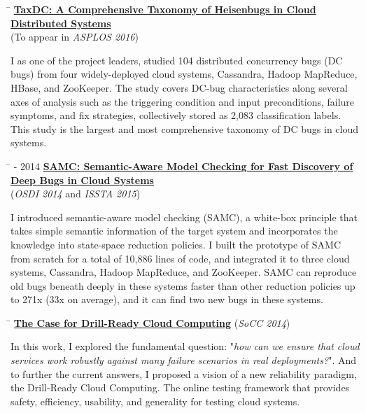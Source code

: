 \documentclass[10pt]{article} %
\begin{document}
\begin{tabbing}
\hspace{2.5cm} \=  \> \href{http://ucare.cs.uchicago.edu/pdf/asplos16-TaxDC.pdf}{\textbf{TaxDC: A Comprehensive Taxonomy of Heisenbugs in Cloud Distributed Systems}} \\
\>\+ (To appear in \textit{ASPLOS 2016}) \\
\begin{minipage}{\smallertextwidth}
I as one of the project leaders, studied 104 distributed concurrency bugs (DC
bugs) from four widely-deployed cloud systems, Cassandra, Hadoop MapReduce,
HBase, and ZooKeeper. The study covers DC-bug characteristics along several axes
of analysis such as the triggering condition and input preconditions, failure
symptoms, and fix strategies, collectively stored as 2,083 classification labels.
This study is the largest and most comprehensive taxonomy of DC bugs in cloud
systems.
\end{minipage}
\end{tabbing}

\begin{tabbing}
\hspace{2.5cm} \=  - 2014 \> \href{http://ucare.cs.uchicago.edu/pdf/osdi14-samc.pdf}{\textbf{SAMC: Semantic-Aware Model Checking for Fast Discovery of Deep Bugs in Cloud Systems}} \\
\>\+ (\textit{OSDI 2014} and \textit{ISSTA 2015}) \\
\begin{minipage}{\smallertextwidth}
I introduced semantic-aware model checking (SAMC), a white-box principle that
takes simple semantic information of the target system and incorporates the
knowledge into state-space reduction policies. I built the prototype of SAMC
from scratch for a total of 10,886 lines of code, and integrated it to three
cloud systems, Cassandra, Hadoop MapReduce, and ZooKeeper. SAMC can reproduce
old bugs beneath deeply in these systems faster than other reduction policies up
to 271x (33x on average), and it can find two new bugs in these systems.
\end{minipage}
\end{tabbing}

\begin{tabbing}
\hspace{2.5cm} \=  \>\+ \href{http://ucare.cs.uchicago.edu/pdf/socc14-drill.pdf}{\textbf{The Case for Drill-Ready Cloud Computing}} (\textit{SoCC 2014}) \\
\begin{minipage}{\smallertextwidth}
In this work, I explored the fundamental question: "\textit{how can we ensure
that cloud services work robustly against many failure scenarios in real
deployments?}". And to further the current answers, I proposed a vision of a new
reliability paradigm, the Drill-Ready Cloud Computing. The online testing
framework that provides safety, efficiency, usability, and generality for
testing cloud systems.
\end{minipage}
\end{tabbing}
\end{document}

